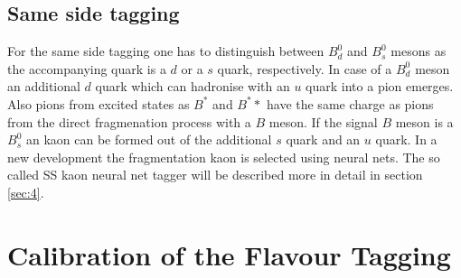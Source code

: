 \documentclass{PoS}
\begin{document}
\subsection{Same side tagging}

For the same side tagging one has to distinguish between $B_d^0$ and $B_s^0$ mesons as the accompanying quark is a $d$ or a $s$ quark, respectively. In case of a $B_d^0$ meson an additional $d$ quark which can hadronise with an $u$ quark into a pion emerges. Also pions from excited states as $B^*$ and $B^**$ have the same charge as pions from the direct fragmenation process with a $B$ meson. If the signal $B$ meson is a $B_s^0$ an kaon can be formed out of the additional $s$ quark and an $u$ quark. In a new development the fragmentation kaon is selected using neural nets. The so called SS kaon neural net tagger will be described more in detail in section \ref{sec:4}.

\section{Calibration of the Flavour Tagging}\label{sec:3}
\end{document}
